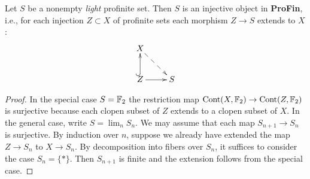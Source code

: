 \documentclass{notes}
\begin{document}
\begin{prop}
Let $S$ be a nonempty {\em light} profinite set. Then $S$ is an
injective object in {\bf ProFin}, i.e., for each injection $Z\subset
X$ of profinite sets each morphism $Z\to S$ extends to $X$: 
$$
\xymatrix{
  X \ar@{-->}[rd] \\ 
  Z \ar@{^{(}->}[u] \ar[r] & S
}
$$
\end{prop}

\begin{proof}
In the special case $S={\mathbb{F}}_2$ the restriction map
${\rm Cont}(X,{\mathbb{F}}_2)\to{\rm Cont}(Z,{\mathbb{F}}_2)$ is surjective because each clopen
subset of $Z$ extends to a clopen subset of $X$. 
In the general case, write $S=\lim_n S_n$. We may assume that each map
$S_{n+1}\to S_n$ is surjective. By induction over $n$, suppose we
already have extended the map $Z\to S_n$ to $X\to S_n$. By
decomposition into fibers over $S_n$, it suffices to consider the case
$S_n=\{*\}$. Then $S_{n+1}$ is finite and the extension follows
from the special case. 
\end{proof}
\end{document}
